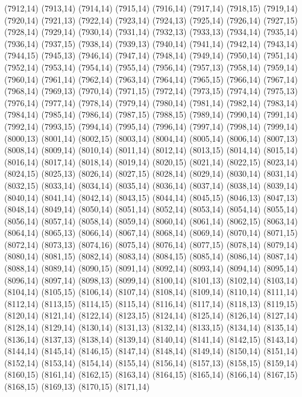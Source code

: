 (7912,14)
(7913,14)
(7914,14)
(7915,14)
(7916,14)
(7917,14)
(7918,15)
(7919,14)
(7920,14)
(7921,13)
(7922,14)
(7923,14)
(7924,13)
(7925,14)
(7926,14)
(7927,15)
(7928,14)
(7929,14)
(7930,14)
(7931,14)
(7932,13)
(7933,13)
(7934,14)
(7935,14)
(7936,14)
(7937,15)
(7938,14)
(7939,13)
(7940,14)
(7941,14)
(7942,14)
(7943,14)
(7944,15)
(7945,13)
(7946,14)
(7947,14)
(7948,14)
(7949,14)
(7950,14)
(7951,14)
(7952,14)
(7953,14)
(7954,14)
(7955,14)
(7956,14)
(7957,13)
(7958,14)
(7959,14)
(7960,14)
(7961,14)
(7962,14)
(7963,14)
(7964,14)
(7965,15)
(7966,14)
(7967,14)
(7968,14)
(7969,13)
(7970,14)
(7971,15)
(7972,14)
(7973,15)
(7974,14)
(7975,13)
(7976,14)
(7977,14)
(7978,14)
(7979,14)
(7980,14)
(7981,14)
(7982,14)
(7983,14)
(7984,14)
(7985,14)
(7986,14)
(7987,15)
(7988,15)
(7989,14)
(7990,14)
(7991,14)
(7992,14)
(7993,15)
(7994,14)
(7995,14)
(7996,14)
(7997,14)
(7998,14)
(7999,14)
(8000,13)
(8001,14)
(8002,15)
(8003,14)
(8004,14)
(8005,14)
(8006,14)
(8007,13)
(8008,14)
(8009,14)
(8010,14)
(8011,14)
(8012,14)
(8013,15)
(8014,14)
(8015,14)
(8016,14)
(8017,14)
(8018,14)
(8019,14)
(8020,15)
(8021,14)
(8022,15)
(8023,14)
(8024,15)
(8025,13)
(8026,14)
(8027,15)
(8028,14)
(8029,14)
(8030,14)
(8031,14)
(8032,15)
(8033,14)
(8034,14)
(8035,14)
(8036,14)
(8037,14)
(8038,14)
(8039,14)
(8040,14)
(8041,14)
(8042,14)
(8043,15)
(8044,14)
(8045,15)
(8046,13)
(8047,13)
(8048,14)
(8049,14)
(8050,14)
(8051,14)
(8052,14)
(8053,14)
(8054,14)
(8055,14)
(8056,14)
(8057,14)
(8058,14)
(8059,14)
(8060,14)
(8061,14)
(8062,15)
(8063,14)
(8064,14)
(8065,13)
(8066,14)
(8067,14)
(8068,14)
(8069,14)
(8070,14)
(8071,15)
(8072,14)
(8073,13)
(8074,16)
(8075,14)
(8076,14)
(8077,15)
(8078,14)
(8079,14)
(8080,14)
(8081,15)
(8082,14)
(8083,14)
(8084,15)
(8085,14)
(8086,14)
(8087,14)
(8088,14)
(8089,14)
(8090,15)
(8091,14)
(8092,14)
(8093,14)
(8094,14)
(8095,14)
(8096,14)
(8097,14)
(8098,13)
(8099,14)
(8100,14)
(8101,13)
(8102,14)
(8103,14)
(8104,14)
(8105,15)
(8106,14)
(8107,14)
(8108,14)
(8109,14)
(8110,14)
(8111,14)
(8112,14)
(8113,15)
(8114,15)
(8115,14)
(8116,14)
(8117,14)
(8118,13)
(8119,15)
(8120,14)
(8121,14)
(8122,14)
(8123,15)
(8124,14)
(8125,14)
(8126,14)
(8127,14)
(8128,14)
(8129,14)
(8130,14)
(8131,13)
(8132,14)
(8133,15)
(8134,14)
(8135,14)
(8136,14)
(8137,13)
(8138,14)
(8139,14)
(8140,14)
(8141,14)
(8142,15)
(8143,14)
(8144,14)
(8145,14)
(8146,15)
(8147,14)
(8148,14)
(8149,14)
(8150,14)
(8151,14)
(8152,14)
(8153,14)
(8154,14)
(8155,14)
(8156,14)
(8157,13)
(8158,15)
(8159,14)
(8160,15)
(8161,14)
(8162,15)
(8163,14)
(8164,15)
(8165,14)
(8166,14)
(8167,15)
(8168,15)
(8169,13)
(8170,15)
(8171,14)
